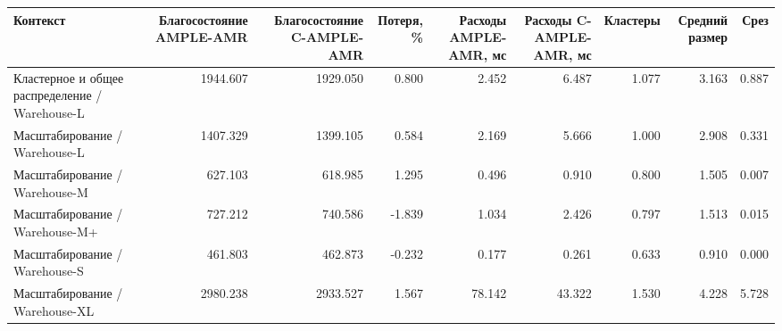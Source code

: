 \begin{tabular}{lrrrrrrrr}
\toprule
 Контекст & Благосостояние AMPLE-AMR & Благосостояние C-AMPLE-AMR & Потеря, \% & Расходы AMPLE-AMR, мс & Расходы C-AMPLE-AMR, мс & Кластеры & Средний размер & Срез \\
\midrule
 Кластерное и общее распределение / Warehouse-L & 1944.607 & 1929.050 & 0.800 & 2.452 & 6.487 & 1.077 & 3.163 & 0.887 \\
 Масштабирование / Warehouse-L & 1407.329 & 1399.105 & 0.584 & 2.169 & 5.666 & 1.000 & 2.908 & 0.331 \\
 Масштабирование / Warehouse-M & 627.103 & 618.985 & 1.295 & 0.496 & 0.910 & 0.800 & 1.505 & 0.007 \\
 Масштабирование / Warehouse-M+ & 727.212 & 740.586 & -1.839 & 1.034 & 2.426 & 0.797 & 1.513 & 0.015 \\
 Масштабирование / Warehouse-S & 461.803 & 462.873 & -0.232 & 0.177 & 0.261 & 0.633 & 0.910 & 0.000 \\
 Масштабирование / Warehouse-XL & 2980.238 & 2933.527 & 1.567 & 78.142 & 43.322 & 1.530 & 4.228 & 5.728 \\
\bottomrule
\end{tabular}
